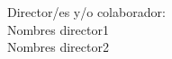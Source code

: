 {\raggedleft
Director/es y/o colaborador:\\
   \vspace{ 1cm}
Nombres director1\\
Nombres  director2\\
}




